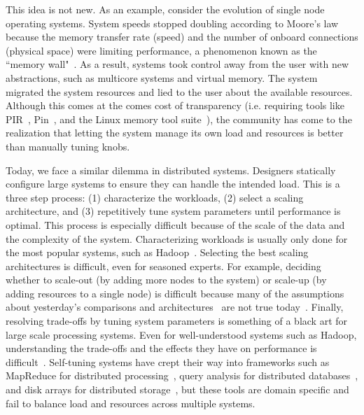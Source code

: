 

This idea is not new. As an example, consider the evolution of single node
operating systems. System speeds stopped doubling according to Moore's law
because the memory transfer rate (speed) and the number of onboard connections
(physical space) were limiting performance, a phenomenon known as the ``memory
wall"~\cite{wulf:sigarch1995-memory-wall}. As a result, systems took control
away from the user with new abstractions, such as multicore systems and virtual
memory. The system migrated the system resources and lied to the user about the
available resources. Although this comes at the comes cost of transparency
(i.e. requiring tools like PIR~\cite{olschanowsky:ICPPW2010-PIR},
Pin~\cite{luk:PLDI2005-pin}, and the Linux memory tool
suite~\cite{movall:atec2005-physical}), the community has come to the
realization that letting the system manage its own load and resources is better
than manually tuning knobs. 

Today, we face a similar dilemma in distributed systems. Designers statically
configure large systems to ensure they can handle the intended load. This is a
three step process: (1) characterize the workloads, (2) select a scaling
architecture, and (3) repetitively tune system parameters until performance is
optimal. This process is especially difficult because of the scale of the data
and the complexity of the system. Characterizing workloads is usually only done
for the most popular systems, such as
Hadoop~\cite{chen:2012ccpe-distributed-db,chen:2012vldb-cross-industry,chen:2011mascots-suites,huang:icde2010-hibench}.
Selecting the best scaling architectures is difficult, even for seasoned
experts. For example, deciding whether to scale-out (by adding more nodes to
the system) or scale-up (by adding resources to a single node) is difficult
because many of the assumptions about yesterday's comparisons and
architectures~\cite{michael:2007pdps-scale-up-x-scale-out,talkington:2002journal-scaling,wisniewski:2007europar-commercial-scale-out}
are not true
today~\cite{appuswamy:socc2013-hadoop-vs-single-node,rowstron:hotcdp2012-hadoop-vs-single-node,sevilla:discs2013-framework,sevilla:lspp2014-supmr}.
Finally, resolving trade-offs by tuning system parameters is something of a
black art for large scale processing systems. Even for well-understood systems
such as Hadoop, understanding the trade-offs and the effects they have on
performance is
difficult~\cite{herodotou:cidr2011-starfish,wang:mascots2009-mrperf}.
Self-tuning systems have crept their way into frameworks such as MapReduce for
distributed processing~\cite{herodotou:cidr2011-starfish}, query analysis for
distributed databases~\cite{lefevre:danac2013-evolutionary-analytics}, and disk
arrays for distributed storage~\cite{anderson:fast2001-hippodrome}, but these
tools are domain specific and fail to balance load and resources across
multiple systems. 

